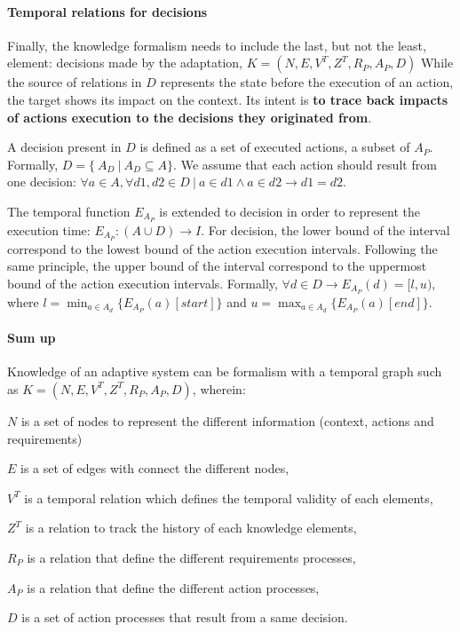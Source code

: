 \paragraph{Temporal relations for decisions}
Finally, the knowledge formalism needs to include the last, but not the least, element: decisions made by the adaptation, $K = (N, E, V^T, Z^T, R_P, A_P, D)$
While the source of relations in $D$ represents the state before the execution of an action, the target shows its impact on the \gls{context}. 
Its intent is \textbf{to trace back impacts of actions execution to the decisions they originated from}.  

A decision present in ${D}$ is defined as a set of executed actions, \ie a subset of ${A_P}$.
Formally, ${D} = \{\ {A_D}~|~{A_D}  \subseteq A\}$.
We assume that each action should result from one decision: $\forall a \in {A}, \forall d1, d2 \in {D}~|~a \in d1 \wedge a \in d2 \rightarrow d1 = d2$.

The temporal function $E_{A_P}$ is extended to decision in order to represent the execution time: $E_{A_P}: (A \cup D) \rightarrow I$.
For decision, the lower bound of the interval correspond to the lowest bound of the action execution intervals.
Following the same principle, the upper bound of the interval correspond to the uppermost bound of the action execution intervals.
Formally, $\forall d \in D \rightarrow E_{A_P}(d) = [l,u)$, where $l = \displaystyle \min_{a \in A_d} \{E_{A_P}(a)[start]\}$ and $u = \displaystyle \max_{a \in A_d} \{E_{A_P}(a)[end]\}$.

\paragraph{Sum up}
Knowledge of an adaptive system can be formalism with a temporal graph such as $K = (N, E, V^T, Z^T, R_P, A_P, D)$, wherein:
\begin{condItemize}
	\item $N$ is a set of nodes to represent the different information (context, actions and requirements)
	\item $E$ is a set of edges with connect the different nodes,
	\item $V^T$ is a temporal relation which defines the temporal validity of each elements,
	\item $Z^T$ is a relation to track the history of each knowledge elements,
	\item $R_P$ is a relation that define the different requirements processes,
	\item $A_P$ is a relation that define the different action processes,
	\item $D$ is a set of action processes that result from a same decision.
\end{condItemize}

